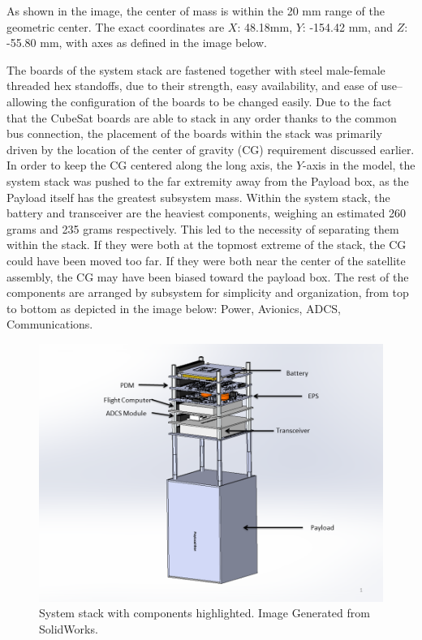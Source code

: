 \documentclass[12pt]{article}
\begin{document}
As shown in the image, the center of mass is within the 20 mm range of the geometric center. The exact coordinates are $X$: 48.18mm, $Y$: -154.42 mm, and $Z$: -55.80 mm, with axes as defined in the image below.

The boards of the system stack are fastened together with steel male-female threaded hex standoffs, due to their strength, easy availability, and ease of use--allowing the configuration of the boards to be changed easily. Due to the fact that the CubeSat boards are able to stack in any order thanks to the common bus connection, the placement of the boards within the stack was primarily driven by the location of the center of gravity (CG) requirement discussed earlier. In order to keep the CG centered along the long axis, the $Y$-axis in the model, the system stack was pushed to the far extremity away from the Payload box, as the Payload itself has the greatest subsystem mass. Within the system stack, the battery and transceiver are the heaviest components, weighing an estimated 260 grams and 235 grams respectively. This led to the necessity of separating them within the stack. If they were both at the topmost extreme of the stack, the CG could have been moved too far. If they were both near the center of the satellite assembly, the CG may have been biased toward the payload box.  The rest of the components are arranged by subsystem for simplicity and organization, from top to bottom as depicted in the image below: Power, Avionics, ADCS, Communications.

\begin{figure}[!ht]
\centering
\includegraphics[width=6in]{images/STR-8.png}
\caption{System stack with components highlighted. Image Generated from SolidWorks.}
\label{fig:str-8}
\end{figure}
\end{document}
